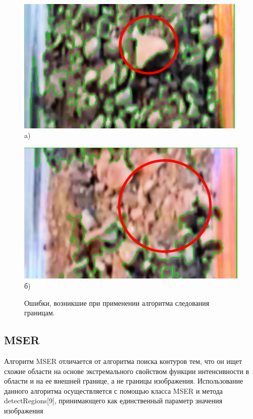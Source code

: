 \documentclass[specification,annotation,times]{itmo-student-thesis}
\begin{document}
\begin{figure}[h]
	\begin{minipage}[h]{0.49\linewidth}
		\centering
			\includegraphics[width=0.9\linewidth]{images/findContour_profile} \\ a)
	\end{minipage}
	\hfill
	\begin{minipage}[h]{0.49\linewidth}
		\centering
		\includegraphics[width=0.9\linewidth]{images/findContours_sep} \\ б)
	\end{minipage}
	\caption{Ошибки, возникшие при применении алгоритма следования границам.}
	\label{ris:findContours}
\end{figure}



\subsection{MSER}
Алгоритм MSER отличается от алгоритма поиска контуров тем, что он ищет схожие области на основе  экстремального свойством функции интенсивности в области и на ее внешней границе, а не границы изображения. Использование  данного алгоритма осуществляется с помощью класса MSER и метода detectRegions[9], принимающего как единственный параметр значения изображения
\end{document}
